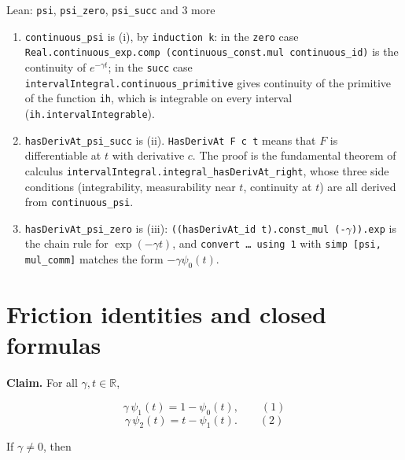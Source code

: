 \documentclass[11pt,a4paper]{article}
\begin{document}
\begin{leanbox}{Lean: \texttt{psi}, \texttt{psi\_\allowbreak{}zero}, \texttt{psi\_\allowbreak{}succ} and 3 more}
\begin{enumerate}


\item \texttt{continuous\_\allowbreak{}psi} is (i), by \texttt{induction k}: in the \texttt{zero} case \texttt{Real.\allowbreak{}continuous\_\allowbreak{}exp.\allowbreak{}comp (continuous\_\allowbreak{}const.\allowbreak{}mul continuous\_\allowbreak{}id)} is the continuity of \(e^{-\gamma t}\); in the \texttt{succ} case \texttt{interval\allowbreak{}Integral.\allowbreak{}continuous\_\allowbreak{}primitive} gives continuity of the primitive of the function \texttt{ih}, which is integrable on every interval (\texttt{ih.\allowbreak{}interval\allowbreak{}Integrable}).

\item \texttt{has\allowbreak{}Deriv\allowbreak{}At\_\allowbreak{}psi\_\allowbreak{}succ} is (ii). \texttt{Has\allowbreak{}Deriv\allowbreak{}At F c t} means that \(F\) is differentiable at \(t\) with derivative \(c\). The proof is the fundamental theorem of calculus \texttt{interval\allowbreak{}Integral.\allowbreak{}integral\_\allowbreak{}has\allowbreak{}Deriv\allowbreak{}At\_\allowbreak{}right}, whose three side conditions (integrability, measurability near \(t\), continuity at \(t\)) are all derived from \texttt{continuous\_\allowbreak{}psi}.

\item \texttt{has\allowbreak{}Deriv\allowbreak{}At\_\allowbreak{}psi\_\allowbreak{}zero} is (iii): \texttt{((has\allowbreak{}Deriv\allowbreak{}At\_\allowbreak{}id t).\allowbreak{}const\_\allowbreak{}mul (-\allowbreak{}\ensuremath{\gamma})).\allowbreak{}exp} is the chain rule for \(\exp(-\gamma t)\), and \texttt{convert … using 1} with \texttt{simp [psi, mul\_\allowbreak{}comm]} matches the form \(-\gamma\psi_0(t)\).

\end{enumerate}
\end{leanbox}

\section{\texorpdfstring{Friction identities and closed formulas}{Friction identities and closed formulas}}


\textbf{Claim.} For all \(\gamma,t\in\mathbb R\),


\[\gamma\,\psi_1(t)=1-\psi_0(t),\qquad(1)\]
\[\gamma\,\psi_2(t)=t-\psi_1(t).\qquad(2)\]


If \(\gamma\neq0\), then
\end{document}
